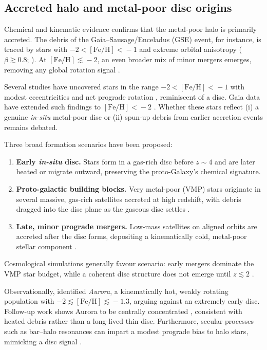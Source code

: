 \documentclass[a4paper,12pt]{article}
\begin{document}
\subsection{Accreted halo and metal-poor disc origins}
\label{subsec:halo_disc_origins}

Chemical and kinematic evidence confirms that the metal-poor halo is primarily accreted.  
The debris of the Gaia–Sausage/Enceladus (GSE) event, for instance, is traced by stars with 
$-2\!<\![\mathrm{Fe/H}]\!<\!-1$ and extreme orbital anisotropy ($\beta\!\gtrsim\!0.8$; 
\citealt{Belokurov2018,Helmi2018}). At $[\mathrm{Fe/H}]\!\lesssim\!-2$, an even broader mix 
of minor mergers emerges, removing any global rotation signal \citep{Lancaster2019,Bird2021}.  

Several studies have uncovered stars in the range 
$-2\!<\![\mathrm{Fe/H}]\!<\!-1$ with modest eccentricities and net prograde rotation 
\citep{Norris1985,Chiba2000,Carollo2019,An2020}, reminiscent of a disc.  
Gaia data have extended such findings to $[\mathrm{Fe/H}]\!<\!-2$  
\citep{Sestito2019,Venn2020,Cordoni2020,Mardini2022}.  
Whether these stars reflect (i) a genuine {\it in-situ} metal-poor disc or (ii) spun-up 
debris from earlier accretion events remains debated.

Three broad formation scenarios have been proposed:
\begin{enumerate}
    \item \textbf{Early {\it in-situ} disc.}  
          Stars form in a gas-rich disc before $z\!\sim\!4$ and are later heated or migrate outward, 
          preserving the proto-Galaxy’s chemical signature. 
    \item \textbf{Proto-galactic building blocks.}  
          Very metal-poor (VMP) stars originate in several massive, gas-rich satellites accreted at high redshift, 
          with debris dragged into the disc plane as the gaseous disc settles \citep[e.g.][]{Sestito2020}. 
    \item \textbf{Late, minor prograde mergers.}  
          Low-mass satellites on aligned orbits are accreted after the disc forms, 
          depositing a kinematically cold, metal-poor stellar component \citep{Santistevan2021}.
\end{enumerate}

Cosmological simulations generally favour scenario: early mergers dominate the VMP star budget, 
while a coherent disc structure does not emerge until $z\!\lesssim\!2$ \citep{Gurvich2023}.
 
Observationally, \citet{Belokurov2022} identified \textit{Aurora}, a kinematically hot, weakly rotating  
population with $-2\!\lesssim\![\mathrm{Fe/H}]\!\lesssim\!-1.3$, arguing against an extremely early disc.  
Follow-up work shows Aurora to be centrally concentrated \citep{Rix2022,Arentsen2020,Arentsen2020a}, 
consistent with heated debris rather than a long-lived thin disc.  
Furthermore, secular processes such as bar–halo resonances can impart a modest prograde bias to halo stars, 
mimicking a disc signal \citep{Dillamore2023}.  
\end{document}
